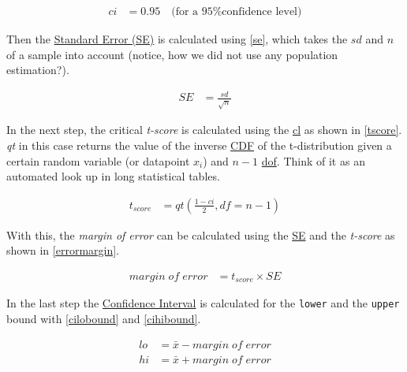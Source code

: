 \documentclass[
  a4paper,
]{scrbook}
\begin{document}
\begin{align}
ci &= 0.95 \quad \text{(for a 95\% confidence level)}
\end{align}

Then the \hyperref[acronyms_SE]{Standard Error (SE)} is calculated using
\eqref{se}, which takes the \(sd\) and \(n\) of a sample into account
(notice, how we did not use any population estimation?).

\begin{align}
SE &= \frac{sd}{\sqrt{n}} \label{se}
\end{align}

In the next step, the critical \emph{t-score} is calculated using the
\hyperref[acronyms_cl]{cl} as shown in \eqref{tscore}. \emph{qt} in this
case returns the value of the inverse \hyperref[acronyms_CDF]{CDF} of
the t-distribution given a certain random variable (or datapoint
\(x_i\)) and \(n-1\) \hyperref[acronyms_dof]{dof}. Think of it as an
automated look up in long statistical tables.

\begin{align}
t_{score} &= qt\left(\frac{1 - ci}{2}, df = n - 1\right) \label{tscore}
\end{align}

With this, the \emph{margin of error} can be calculated using the
\hyperref[acronyms_SE]{SE} and the \emph{t-score} as shown in
\eqref{errormargin}.

\begin{align}
margin\;of\;error &= t_{score} \times SE \label{errormargin}
\end{align}

In the last step the \hyperref[ci]{Confidence Interval} is calculated
for the \texttt{lower} and the \texttt{upper} bound with
\eqref{cilobound} and \eqref{cihibound}.

\begin{align}
lo &= \bar{x} - margin\;of\;error \label{cilobound} \\
hi &= \bar{x} + margin\;of\;error \label{cihibound}
\end{align}
\end{document}
